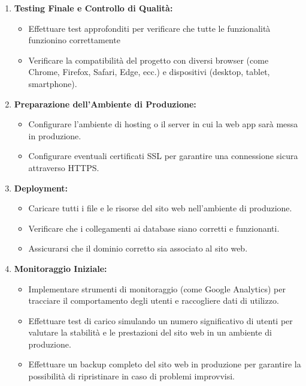 \documentclass[oneside]{book}
\begin{document}
\begin{enumerate}
    \item \textbf{Testing Finale e Controllo di Qualità:}
    \begin{itemize}
        \item Effettuare test approfonditi per verificare che tutte le funzionalità funzionino correttamente
        \item Verificare la compatibilità del progetto con diversi browser (come Chrome, Firefox, Safari, Edge, ecc.) e dispositivi (desktop, tablet, smartphone).
    \end{itemize}
    
    \item \textbf{Preparazione dell'Ambiente di Produzione:}
    \begin{itemize}
        \item Configurare l'ambiente di hosting o il server in cui la web app sarà messa in produzione.
        \item Configurare eventuali certificati SSL per garantire una connessione sicura attraverso HTTPS.
    \end{itemize}
    
    \item \textbf{Deployment:}
    \begin{itemize}
        \item Caricare tutti i file e le risorse del sito web nell'ambiente di produzione.
        \item Verificare che i collegamenti ai database siano corretti e funzionanti.
        \item Assicurarsi che il dominio corretto sia associato al sito web.
    \end{itemize}
    
    \item \textbf{Monitoraggio Iniziale:}
    \begin{itemize}
        \item Implementare strumenti di monitoraggio (come Google Analytics) per tracciare il comportamento degli utenti e raccogliere dati di utilizzo.
         \item Effettuare test di carico simulando un numero significativo di utenti per valutare la stabilità e le prestazioni del sito web in un ambiente di produzione.
           \item Effettuare un backup completo del sito web in produzione per garantire la possibilità di ripristinare in caso di problemi improvvisi.
    \end{itemize}
    

\end{enumerate}
\end{document}
